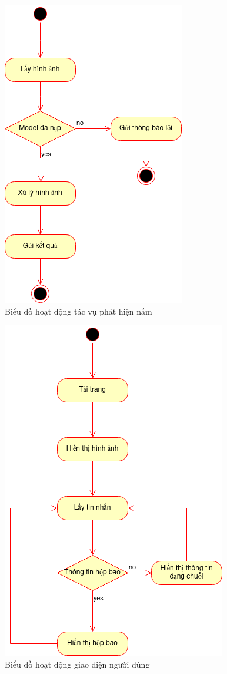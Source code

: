 \begin{figure}
    \centering
    \includegraphics[width=0.55\linewidth]{images/vision-actvity.png}
    \caption{Biểu đồ hoạt động tác vụ phát hiện nấm}
    \label{fig:vision-activity}
\end{figure}


\begin{figure}[H]
    \centering
    \includegraphics[width=0.55\linewidth]{images/ui-activity.png}
    \caption{Biểu đồ hoạt động giao diện người dùng}
    \label{fig:ui-activity}
\end{figure}

